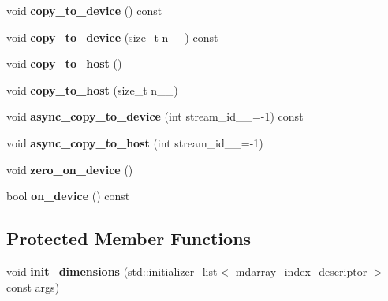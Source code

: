 \begin{DoxyCompactItemize}
\item 
\hypertarget{classsddk_1_1mdarray__base_ab9873fa80a2ce518919401e868dd101a}{}void {\bfseries copy\+\_\+to\+\_\+device} () const \label{classsddk_1_1mdarray__base_ab9873fa80a2ce518919401e868dd101a}

\item 
\hypertarget{classsddk_1_1mdarray__base_a2129360765b27c13dae4fb78d21e3cb1}{}void {\bfseries copy\+\_\+to\+\_\+device} (size\+\_\+t n\+\_\+\+\_\+) const \label{classsddk_1_1mdarray__base_a2129360765b27c13dae4fb78d21e3cb1}

\item 
\hypertarget{classsddk_1_1mdarray__base_a89ba0c2c6df59f89a2f3b5ceea82e7c9}{}void {\bfseries copy\+\_\+to\+\_\+host} ()\label{classsddk_1_1mdarray__base_a89ba0c2c6df59f89a2f3b5ceea82e7c9}

\item 
\hypertarget{classsddk_1_1mdarray__base_aeedd9fca9c7ed13cbd56f4a53c36a9af}{}void {\bfseries copy\+\_\+to\+\_\+host} (size\+\_\+t n\+\_\+\+\_\+)\label{classsddk_1_1mdarray__base_aeedd9fca9c7ed13cbd56f4a53c36a9af}

\item 
\hypertarget{classsddk_1_1mdarray__base_ad97546306b7fd6d127f60b21a9ad9d2f}{}void {\bfseries async\+\_\+copy\+\_\+to\+\_\+device} (int stream\+\_\+id\+\_\+\+\_\+=-\/1) const \label{classsddk_1_1mdarray__base_ad97546306b7fd6d127f60b21a9ad9d2f}

\item 
\hypertarget{classsddk_1_1mdarray__base_a95ba5ccdfe71592665b3a91c3dfd3992}{}void {\bfseries async\+\_\+copy\+\_\+to\+\_\+host} (int stream\+\_\+id\+\_\+\+\_\+=-\/1)\label{classsddk_1_1mdarray__base_a95ba5ccdfe71592665b3a91c3dfd3992}

\item 
\hypertarget{classsddk_1_1mdarray__base_a6be4aac11c2480f96d4651bcbea1f2ed}{}void {\bfseries zero\+\_\+on\+\_\+device} ()\label{classsddk_1_1mdarray__base_a6be4aac11c2480f96d4651bcbea1f2ed}

\item 
\hypertarget{classsddk_1_1mdarray__base_a52430af26b0c066853a24620a517eacf}{}bool {\bfseries on\+\_\+device} () const \label{classsddk_1_1mdarray__base_a52430af26b0c066853a24620a517eacf}

\end{DoxyCompactItemize}
\subsection*{Protected Member Functions}
\begin{DoxyCompactItemize}
\item 
\hypertarget{classsddk_1_1mdarray__base_a8504b6c1cecae2f6d6c2f61c0973da11}{}void {\bfseries init\+\_\+dimensions} (std\+::initializer\+\_\+list$<$ \hyperlink{classsddk_1_1mdarray__index__descriptor}{mdarray\+\_\+index\+\_\+descriptor} $>$ const args)\label{classsddk_1_1mdarray__base_a8504b6c1cecae2f6d6c2f61c0973da11}

\end{DoxyCompactItemize}
